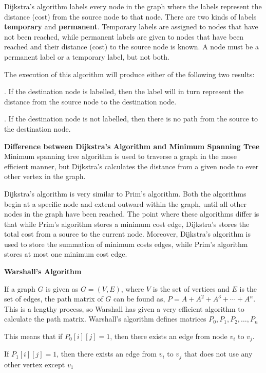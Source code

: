 \vskip 1mm
Dijkstra's algorithm labels every node in the graph where the labels represent the distance (cost) from the source node to that node. There are two kinds of labels {\bf temporary} and {\bf permanent}. Temporary labels are assigned to nodes that have not been reached, while permanent labels are given to nodes that have been reached and their distance (cost) to the source node is known. A node must be a permanent label or a temporary label, but not both.

\vskip 1mm
The execution of this algorithm will produce either of the following two results:

\vskip 3mm
. If the destination node is labelled, then the label will in turn represent the distance from the source node to the destination node.

\vskip 3mm
. If the destination node is not labelled, then there is no path from the source to the destination node.

\vskip 3mm
{\bf Difference between Dijkstra's Algorithm and Minimum Spanning Tree}
\vskip 1mm
Minimum spanning tree algorithm is used to traverse a graph in the mose efficient manner, but Dijkstra's calculates the distance from a given node to ever other vertex in the graph.

\vskip 1mm
Dijkstra's algorithm is very similar to Prim's algorithm. Both the algorithms begin at a specific node and extend outward within the graph, until all other nodes in the graph have been reached. The point where these algorithms differ is that while Prim's algorithm stores a minimum cost edge, Dijkstra's stores the total cost from a source to the current node. Moreover, Dijkstra's algorithm is used to store the summation of minimum costs edges, while Prim's algorithm stores at most one minimum cost edge.

\filbreak
\vskip 1cm
{\bf Warshall's Algorithm}

\vskip 1mm
If a graph $G$ is given as $G=(V,E)$, where $V$ is the set of vertices and $E$ is the set of edges, the path matrix of $G$ can be found as, $P=A+A^2+A^3+\cdots+A^n$. This is a lengthy process, so Warshall has given a very efficient algorithm to calculate the path matrix. Warshall's algorithm defines matrices $P_0, P_1, P_2,\ldots, P_n$

\vskip 1mm
This means that if $P_0[i][j]=1$, then there exists an edge from node $v_i$ to $v_j$.

\vskip 1mm
If $P_1[i][j]=1$, then there exists an edge from $v_i$ to $v_j$ that does not use any other vertex except $v_1$

